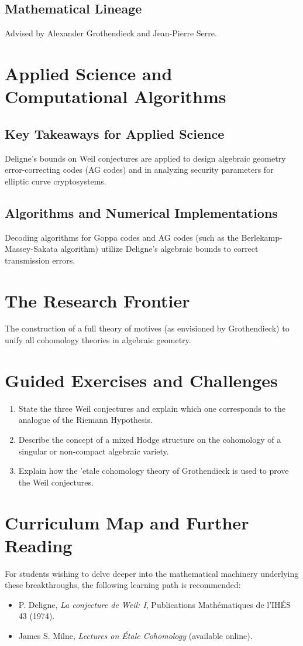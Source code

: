 \subsection{Mathematical Lineage}
Advised by Alexander Grothendieck and Jean-Pierre Serre.

\section{Applied Science and Computational Algorithms}
\subsection{Key Takeaways for Applied Science}
Deligne's bounds on Weil conjectures are applied to design algebraic geometry error-correcting codes (AG codes) and in analyzing security parameters for elliptic curve cryptosystems.

\subsection{Algorithms and Numerical Implementations}
Decoding algorithms for Goppa codes and AG codes (such as the Berlekamp-Massey-Sakata algorithm) utilize Deligne's algebraic bounds to correct transmission errors.

\section{The Research Frontier}
The construction of a full theory of motives (as envisioned by Grothendieck) to unify all cohomology theories in algebraic geometry.

\section{Guided Exercises and Challenges}
\begin{enumerate}[label=\textbf{\arabic*.}]
  \item State the three Weil conjectures and explain which one corresponds to the analogue of the Riemann Hypothesis.
  \item Describe the concept of a mixed Hodge structure on the cohomology of a singular or non-compact algebraic variety.
  \item Explain how the 'etale cohomology theory of Grothendieck is used to prove the Weil conjectures.
\end{enumerate}

\section{Curriculum Map and Further Reading}
For students wishing to delve deeper into the mathematical machinery underlying these breakthroughs, the following learning path is recommended:
\begin{itemize}
  \item P. Deligne, \emph{La conjecture de Weil: I}, Publications Math\'ematiques de l'IH\'ES 43 (1974).
  \item James S. Milne, \emph{Lectures on \'Etale Cohomology} (available online).
\end{itemize}

